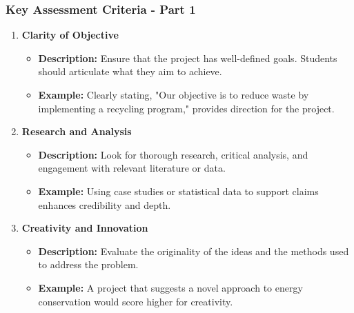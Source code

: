 \documentclass[aspectratio=169]{beamer}
\begin{document}
\begin{frame}[fragile]
    \frametitle{Key Assessment Criteria - Part 1}
    \begin{enumerate}
        \item \textbf{Clarity of Objective}
        \begin{itemize}
            \item \textbf{Description:} Ensure that the project has well-defined goals. Students should articulate what they aim to achieve.
            \item \textbf{Example:} Clearly stating, "Our objective is to reduce waste by implementing a recycling program," provides direction for the project.
        \end{itemize}

        \item \textbf{Research and Analysis}
        \begin{itemize}
            \item \textbf{Description:} Look for thorough research, critical analysis, and engagement with relevant literature or data.
            \item \textbf{Example:} Using case studies or statistical data to support claims enhances credibility and depth.
        \end{itemize}

        \item \textbf{Creativity and Innovation}
        \begin{itemize}
            \item \textbf{Description:} Evaluate the originality of the ideas and the methods used to address the problem.
            \item \textbf{Example:} A project that suggests a novel approach to energy conservation would score higher for creativity.
        \end{itemize}
    \end{enumerate}
\end{frame}
\end{document}

